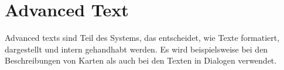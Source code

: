
\renewcommand{\kapitelautor}{Autor: Felix Zwickelstorfer}
\section{Advanced Text}\label{sec:advanced-text}
\renewcommand{\kapitelautor}{Autor: Felix Zwickelstorfer}

Advanced texts sind Teil des Systems, das entscheidet, wie Texte formatiert, dargestellt und intern gehandhabt werden.
Es wird beispielsweise bei den Beschreibungen von Karten als auch bei den Texten in Dialogen verwendet.



